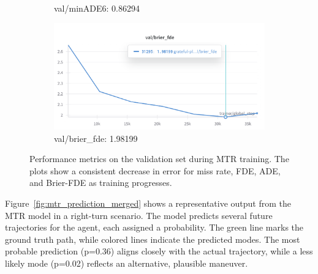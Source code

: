 \begin{figure}[htbp]
\begin{subfigure}[b]{0.48\textwidth}
        \caption{val/minADE6: 0.86294}
    \end{subfigure}
    \hfill
    \begin{subfigure}[b]{0.48\textwidth}
        \centering
        \includegraphics[clip, width=\textwidth]{figures/val_brier_fde.png}
        \caption{val/brier\_fde: 1.98199}
    \end{subfigure}
    \caption{Performance metrics on the validation set during MTR training. The plots show a consistent decrease in error for miss rate, FDE, ADE, and Brier-FDE as training progresses. }
    \label{fig:validation_metrics_merged}
\end{figure}

\label{sec:results_qualitative_merged}

Figure~\ref{fig:mtr_prediction_merged} shows a representative output from the MTR model in a right-turn scenario. The model predicts several future trajectories for the agent, each assigned a probability. The green line marks the ground truth path, while colored lines indicate the predicted modes. The most probable prediction (p=0.36) aligns closely with the actual trajectory, while a less likely mode (p=0.02) reflects an alternative, plausible maneuver.

